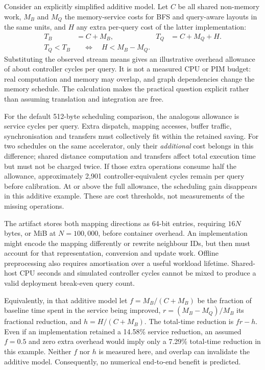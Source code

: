 \documentclass[11pt,a4paper]{report}
\begin{document}
Consider an explicitly simplified additive model. Let $C$ be all shared non-memory work, $M_B$ and $M_Q$ the memory-service costs for BFS and query-aware layouts in the same units, and $H$ any extra per-query cost of the latter implementation:
\begin{align}
 T_B &= C+M_B, & T_Q &= C+M_Q+H.\\
 T_Q<T_B &\quad\Longleftrightarrow\quad H<M_B-M_Q.
\end{align}
Substituting the observed stream means gives an illustrative overhead allowance of about \SavedCyclesPerQuery{} controller cycles per query. It is not a measured CPU or PIM budget: real computation and memory may overlap, and graph dependencies change the memory schedule. The calculation makes the practical question explicit rather than assuming translation and integration are free.

For the default 512-byte scheduling comparison, the analogous allowance is \RoundRobinBFSSavedFloat{} service cycles per query. Extra dispatch, mapping accesses, buffer traffic, synchronisation and transfers must collectively fit within the retained saving. For two schedules on the same accelerator, only their \emph{additional} cost belongs in this difference; shared distance computation and transfers affect total execution time but must not be charged twice. If those extra operations consume half the allowance, approximately 2,901 controller-equivalent cycles remain per query before calibration. At or above the full allowance, the scheduling gain disappears in this additive example. These are cost thresholds, not measurements of the missing operations.

The artifact stores both mapping directions as 64-bit entries, requiring $16N$ bytes, or \MappingMiB{} MiB at $N=100{,}000$, before container overhead. An implementation might encode the mapping differently or rewrite neighbour IDs, but then must account for that representation, conversion and update work. Offline preprocessing also requires amortisation over a useful workload lifetime. Shared-host CPU seconds and simulated controller cycles cannot be mixed to produce a valid deployment break-even query count.

Equivalently, in that additive model let $f=M_B/(C+M_B)$ be the fraction of baseline time spent in the service being improved, $r=(M_B-M_Q)/M_B$ its fractional reduction, and $h=H/(C+M_B)$. The total-time reduction is $fr-h$. Even if an implementation retained a 14.58\% service reduction, an assumed $f=0.5$ and zero extra overhead would imply only a 7.29\% total-time reduction in this example. Neither $f$ nor $h$ is measured here, and overlap can invalidate the additive model. Consequently, no numerical end-to-end benefit is predicted.
\end{document}
